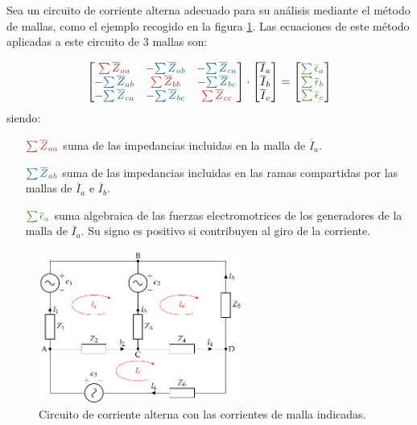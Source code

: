 Sea un circuito de corriente alterna adecuado para su análisis
mediante el método de mallas, como el ejemplo recogido en la figura
\ref{fig:mallas-alterna}. Las ecuaciones de este método aplicadas a
este circuito de 3 mallas son:

\begin{equation*}
  \begin{bmatrix}
    {\color{BrickRed}\sum \overline{Z}_{aa}} &  - {\color{MidnightBlue}\sum \overline{Z}_{ab}} & - {\color{MidnightBlue}\sum \overline{Z}_{ca}} \\
    - {\color{MidnightBlue}\sum \overline{Z}_{ab}} & {\color{BrickRed}\sum \overline{Z}_{bb}} & - {\color{MidnightBlue}\sum \overline{Z}_{bc}} \\
    - {\color{MidnightBlue}\sum \overline{Z}_{ca}} & - {\color{MidnightBlue}\sum \overline{Z}_{bc}} &  {\color{BrickRed}\sum \overline{Z}_{cc}}
  \end{bmatrix} \cdot %
  \begin{bmatrix}
    \overline{I}_a\\
    \overline{I}_b\\
    \overline{I}_c\\
  \end{bmatrix} = %
  \begin{bmatrix}
    {\color{OliveGreen}\sum\overline{\epsilon}_a}\\
    {\color{OliveGreen}\sum\overline{\epsilon}_b}\\
    {\color{OliveGreen}\sum\overline{\epsilon}_c}
  \end{bmatrix}
\end{equation*}
siendo:
\begin{itemize}
\item[{\({\color{BrickRed}\sum \overline{Z}_{aa}}\)}] suma de las
  impedancias incluidas en la malla de \(\overline{I}_a\).
\item[{\({\color{MidnightBlue}\sum \overline{Z}_{ab}}\)}] suma de las
  impedancias incluidas en las ramas compartidas por las mallas de
  \(\overline{I}_a\) e \(\overline{I}_b\).
\item[{\({\color{OliveGreen}\sum \overline{\epsilon}_a}\)}] suma
  algebraica de las fuerzas electromotrices de los generadores de la
  malla de \(\overline{I}_a\). Su signo es positivo si contribuyen al
  giro de la corriente.
\end{itemize}

\begin{figure}[H]
  \centering \includegraphics[height=5cm]{../figs/mallas_alterna.pdf}
  \caption{Circuito de corriente alterna con las corrientes de malla
    indicadas.}
  \label{fig:mallas-alterna}
\end{figure}

